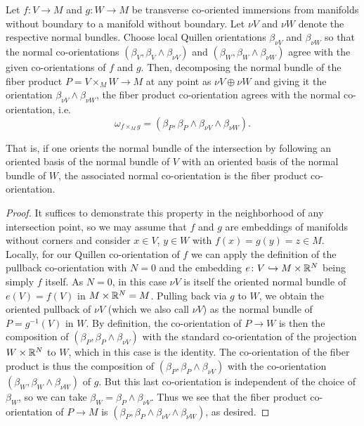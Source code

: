 \begin{proposition}\label{P: normal pullback}
	Let $f \colon V \to M$ and $g \colon W \to M$ be transverse co-oriented immersions from manifolds without boundary to a manifold without boundary.
	Let $\nu V$ and $\nu W$ denote the respective normal bundles.
	Choose local Quillen orientations $\beta_{\nu V}$ and $\beta_{\nu W}$ so that the normal co-orientations $(\beta_V, \beta_V \wedge \beta_{\nu V})$ and $(\beta_W, \beta_W \wedge \beta_{\nu W})$ agree with the given co-orientations of $f$ and $g$.
	Then, decomposing the normal bundle of the fiber product $P = V \times_M W \to M$ at any point as $\nu V \oplus \nu W$ and giving it the orientation $\beta_{\nu V} \wedge \beta_{\nu W}$, the fiber product co-orientation agrees with the normal co-orientation, i.e.\
	$$\omega_{f \times_M g} = (\beta_P,\beta_P \wedge \beta_{\nu V} \wedge \beta_{\nu W}).$$
\end{proposition}

That is, if one orients the normal bundle of the intersection by following an oriented basis of the normal bundle of $V$ with an oriented basis of the normal bundle of $W$, the associated normal co-orientation is the fiber product co-orientation.

\begin{proof}
	It suffices to demonstrate this property in the neighborhood of any intersection point, so we may assume that $f$ and $g$ are embeddings of manifolds without corners and consider $x \in V$, $y \in W$ with $f(x) = g(y) = z \in M$.
	Locally, for our Quillen co-orientation of $f$ we can apply the definition of the pullback co-orientation with $N = 0$ and the embedding $e \colon V \hookrightarrow M \times \mathbb{R}^N$ being simply $f$ itself.
	As $N = 0$, in this case $\nu V$ is itself the oriented normal bundle of $e(V) = f(V)$ in $M \times \mathbb{R}^N = M$.
	Pulling back via $g$ to $W$, we obtain the oriented pullback of $\nu V$ (which we also call $\nu V$) as the normal bundle of $P = g^{-1}(V)$ in $W$.
	By definition, the co-orientation of $P \to W$ is then the composition of $(\beta_P,\beta_P \wedge \beta_{\nu V})$ with the standard co-orientation of the projection $W \times \mathbb{R}^N$ to $W$, which in this case is the identity.
	The co-orientation of the fiber product is thus the composition of $(\beta_P,\beta_P \wedge \beta_{\nu V})$ with the co-orientation $(\beta_W, \beta_W \wedge \beta_{\nu W})$ of $g$.
	But this last co-orientation is independent of the choice of $\beta_W$, so we can take $\beta_W = \beta_P \wedge \beta_{\nu V}$.
	Thus we see that the fiber product co-orientation of $P \to M$ is $(\beta_P, \beta_P \wedge \beta_{\nu V} \wedge \beta_{\nu W})$, as desired.
\end{proof}

